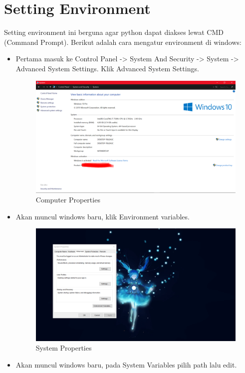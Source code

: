 \documentclass{article}
\begin{document}
\section{Setting Environment}
Setting environment ini berguna agar python dapat diakses lewat CMD (Command Prompt). Berikut adalah cara mengatur environment di windows:

\begin{itemize}
\item Pertama masuk ke Control Panel -> System And Security -> System -> Advanced System Settings. Klik Advanced System Settings.
\begin{figure}[!htbp]
	\centering
	\includegraphics[scale=0.5]{figures/envi1.png}
	\caption{Computer Properties}
\end{figure}
\item Akan muncul windows baru, klik Environment variables.
\begin{figure}[!htbp]
	\centering
	\includegraphics[scale=0.5]{figures/envi2.png}
	\caption{System Properties}
\end{figure}
\item Akan muncul windows baru, pada System Variables pilih path lalu edit.

\end{itemize}
\end{document}
